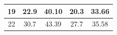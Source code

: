 \documentclass{article}
\begin{document}
\begin{Large}
\begin{table}[h]
\begin{tabular}{|c|cc|cc|}
19                                                                       & \multicolumn{1}{c|}{22.9}                                                    & 40.10                                                       & \multicolumn{1}{c|}{20.3}                                                    & 33.66                                                       \\ \hline
22                                                                       & \multicolumn{1}{c|}{30.7}                                                    & 43.39                                                       & \multicolumn{1}{c|}{27.7}                                                    & 35.58                                                       \\ \hline
\end{tabular}
\end{table}


\newpage

\end{Large}
\end{document}
